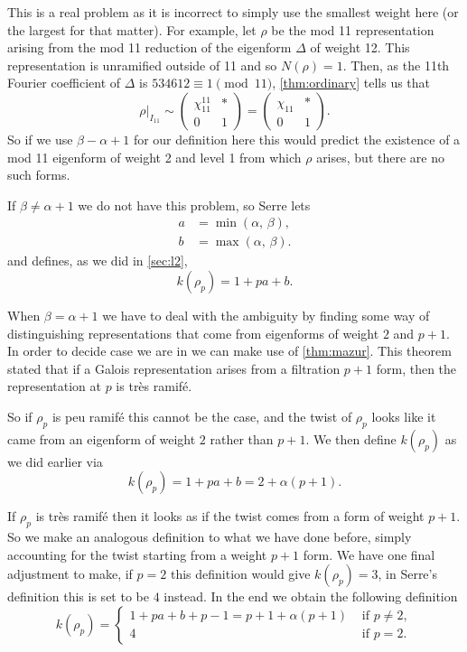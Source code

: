\documentclass[a4paper,12pt]{article}
\begin{document}
This is a real problem as it is incorrect to simply use the smallest weight here (or the largest for that matter).
For example, let $\rho$ be the mod 11 representation arising from the mod 11 reduction of the eigenform $\Delta$ of weight 12.
This representation is unramified outside of 11 and so $N(\rho) =1$.
Then, as the 11th Fourier coefficient of $\Delta$ is $534612\equiv 1 \pmod{11}$, \cref{thm:ordinary} tells us that
\[
\rho|_{I_{11}} \sim \begin{pmatrix} \chi_{11}^{11} & * \\ 0 & 1\end{pmatrix} = \begin{pmatrix} \chi_{11} & * \\ 0 & 1\end{pmatrix}.
\]
So if we use $\beta - \alpha + 1$ for our definition here this would predict the existence of a mod 11 eigenform of weight 2 and level 1 from which $\rho$ arises, but there are no such forms.

If $\beta \ne \alpha + 1$ we do not have this problem, so Serre lets
\begin{align*}
a &= \min(\alpha,\, \beta),\\
b &= \max(\alpha,\, \beta).
\end{align*}
and defines, as we did in \cref{sec:l2},
\begin{equation}\label{eq:l1nt}
k(\rho_p) = 1 + pa + b. %
\end{equation}

When $\beta = \alpha + 1$ we have to deal with the ambiguity by finding some way of distinguishing representations that come from eigenforms of weight $2$ and $p + 1$.
In order to decide case we are in we can make use of \cref{thm:mazur}.
This theorem stated that if a Galois representation arises from a filtration $p+1$ form, then the representation at $p$ is tr\`es ramif\'e.

So if $\rho_p$ is peu ramif\'e this cannot be the case, and the twist of $\rho_p$ looks like it came from an eigenform of weight $2$ rather than $p+1$.
We then define $k(\rho_p)$ as we did earlier via
\begin{equation}\label{eq:peu}
k(\rho_p) = 1 + pa + b = 2 + \alpha(p+1).
\end{equation}

If $\rho_p$ is tr\`es ramif\'e then it looks as if the twist comes from a form of weight $p+1$.
So we make an analogous definition to what we have done before, simply accounting for the twist starting from a weight $p+1$ form.
We have one final adjustment to make, if $p=2$ this definition would give $k(\rho_p) = 3$, in Serre's definition this is set to be $4$ instead.
In the end we obtain the following definition
\begin{equation}\label{eq:tres}
k(\rho_p) = \begin{cases}
1 + pa + b + p - 1 = p + 1 + \alpha(p+1) & \text{ if }p\ne 2,\\
4 & \text{ if } p = 2.
\end{cases}
\end{equation}
\end{document}
